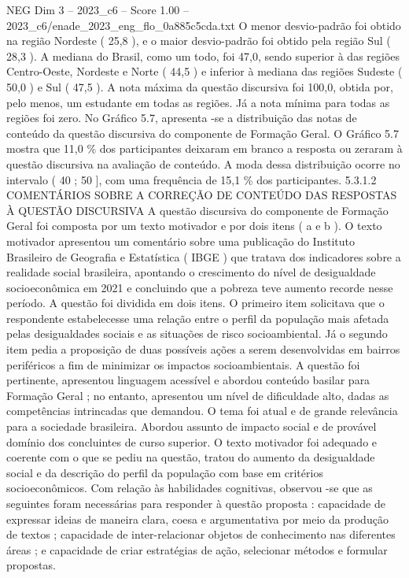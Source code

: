 \begin{textsample}{NEG Dim 3 – 2023\_c6 – Score 1.00 – 2023\_c6/enade\_2023\_eng\_flo\_0a885c5cda.txt}
O menor desvio-padrão foi obtido na região Nordeste ( 25,8 ), e o maior desvio-padrão foi obtido pela região Sul ( 28,3 ).
A mediana do Brasil, como um todo, foi 47,0, sendo superior à das regiões Centro-Oeste, Nordeste e Norte ( 44,5 ) e inferior à mediana das regiões Sudeste ( 50,0 ) e Sul ( 47,5 ).
A nota máxima da questão discursiva foi 100,0, obtida por, pelo menos, um estudante em todas as regiões.
Já a nota mínima para todas as regiões foi zero.
No Gráfico 5.7, apresenta -se a distribuição das notas de conteúdo da questão discursiva do componente de Formação Geral.
O Gráfico 5.7 mostra que 11,0 \% dos participantes deixaram em branco a resposta ou zeraram à questão discursiva na avaliação de conteúdo.
A moda dessa distribuição ocorre no intervalo ( 40 ; 50 ], com uma frequência de 15,1 \% dos participantes. 5.3.1.2 COMENTÁRIOS SOBRE A CORREÇÃO DE CONTEÚDO DAS RESPOSTAS À QUESTÃO DISCURSIVA A questão discursiva do componente de Formação Geral foi composta por um texto motivador e por dois itens ( a e b ).
O texto motivador apresentou um comentário sobre uma publicação do Instituto Brasileiro de Geografia e Estatística ( IBGE ) que tratava dos indicadores sobre a realidade social brasileira, apontando o crescimento do nível de desigualdade socioeconômica em 2021 e concluindo que a pobreza teve aumento recorde nesse período.
A questão foi dividida em dois itens.
O primeiro item solicitava que o respondente estabelecesse uma relação entre o perfil da população mais afetada pelas desigualdades sociais e as situações de risco socioambiental.
Já o segundo item pedia a proposição de duas possíveis ações a serem desenvolvidas em bairros periféricos a fim de minimizar os impactos socioambientais.
A questão foi pertinente, apresentou linguagem acessível e abordou conteúdo basilar para Formação Geral ; no entanto, apresentou um nível de dificuldade alto, dadas as competências intrincadas que demandou.
O tema foi atual e de grande relevância para a sociedade brasileira.
Abordou assunto de impacto social e de provável domínio dos concluintes de curso superior.
O texto motivador foi adequado e coerente com o que se pediu na questão, tratou do aumento da desigualdade social e da descrição do perfil da população com base em critérios socioeconômicos.
Com relação às habilidades cognitivas, observou -se que as seguintes foram necessárias para responder à questão proposta : capacidade de expressar ideias de maneira clara, coesa e argumentativa por meio da produção de textos ; capacidade de inter-relacionar objetos de conhecimento nas diferentes áreas ; e capacidade de criar estratégias de ação, selecionar métodos e formular propostas.

\end{textsample}
